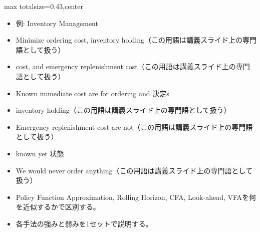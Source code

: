 \clearpage
{}
\begin{minipage}[t]{0.405\textwidth}
\begin{adjustbox}{max totalsize={\textwidth}{0.43\textheight},center}
\begin{minipage}{\textwidth}\scriptsize
{}\begin{itemize}
\item 例: Inventory Management
\item Minimize ordering cost, inventory holding（この用語は講義スライド上の専門語として扱う）
\item cost, and emergency replenishment cost（この用語は講義スライド上の専門語として扱う）
\item Known immediate cost are for ordering and 決定s
\item inventory holding（この用語は講義スライド上の専門語として扱う）
\item Emergency replenishment cost are not（この用語は講義スライド上の専門語として扱う）
\item known yet 状態
\item We would never order anything（この用語は講義スライド上の専門語として扱う）
\end{itemize}\begin{itemize}
\item Policy Function Approximation, Rolling Horizon, CFA, Look-ahead, VFAを何を近似するかで区別する。
\item 各手法の強みと弱みを1セットで説明する。
\end{itemize}
\end{minipage}
\end{adjustbox}
\end{minipage}\hfill
